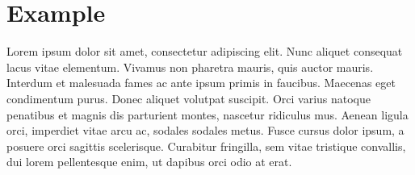 \documentclass[12pt]{article}
\begin{document}
\section*{Example}

Lorem ipsum dolor sit amet, consectetur adipiscing elit.
Nunc aliquet consequat lacus vitae elementum.
Vivamus non pharetra mauris, quis auctor mauris.
Interdum et malesuada fames ac ante ipsum primis in faucibus.
Maecenas eget condimentum purus.
Donec aliquet volutpat suscipit.
Orci varius natoque penatibus et magnis dis parturient montes, nascetur ridiculus mus.
Aenean ligula orci, imperdiet vitae arcu ac, sodales sodales metus.
Fusce cursus dolor ipsum, a posuere orci sagittis scelerisque.
Curabitur fringilla, sem vitae tristique convallis, dui lorem pellentesque enim, ut dapibus orci odio at erat.
\end{document}
